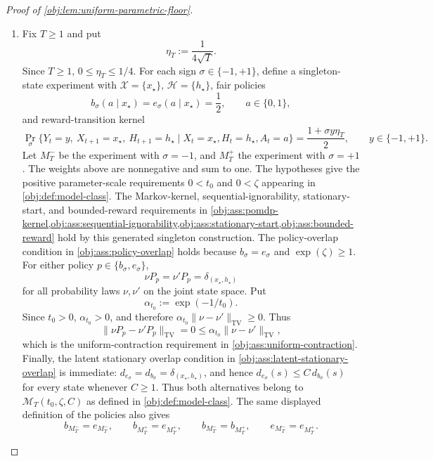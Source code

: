 \begin{proof}[Proof of \cref{obj:lem:uniform-parametric-floor}]
\begin{enumerate}
\item Fix \(T\ge 1\) and put
\[
\eta_T:=\frac{1}{4\sqrt T}.
\]
Since \(T\ge1\), \(0\le \eta_T\le 1/4\).  For each sign
\(\sigma\in\{-1,+1\}\), define a singleton-state experiment with
\(\mathcal X=\{x_\star\}\), \(\mathcal H=\{h_\star\}\), fair policies
\[
b_\sigma(a\mid x_\star)=e_\sigma(a\mid x_\star)=\frac12,
\qquad a\in\{0,1\},
\]
and reward-transition kernel
\[
\Pr_\sigma\{Y_t=y,\ X_{t+1}=x_\star,\ H_{t+1}=h_\star
       \mid X_t=x_\star,H_t=h_\star,A_t=a\}
=
\frac{1+\sigma y\eta_T}{2},
\qquad y\in\{-1,+1\}.
\]
Let \(M_T^{-}\) be the experiment with \(\sigma=-1\), and \(M_T^{+}\) the
experiment with \(\sigma=+1\).  The weights above are nonnegative and sum to
one.  The hypotheses give the positive parameter-scale requirements
\(0<t_0\) and \(0<\zeta\) appearing in \cref{obj:def:model-class}.  The
Markov-kernel, sequential-ignorability, stationary-start, and bounded-reward
requirements in
\cref{obj:ass:pomdp-kernel,obj:ass:sequential-ignorability,obj:ass:stationary-start,obj:ass:bounded-reward}
hold by this generated singleton construction.  The policy-overlap condition
in \cref{obj:ass:policy-overlap} holds because \(b_\sigma=e_\sigma\) and
\(\exp(\zeta)\ge1\).  For either policy \(p\in\{b_\sigma,e_\sigma\}\),
\[
\nu P_p=\nu'P_p=\delta_{(x_\star,h_\star)}
\]
for all probability laws \(\nu,\nu'\) on the joint state space.  Put
\[
\alpha_{t_0}:=\exp(-1/t_0).
\]
Since \(t_0>0\), \(\alpha_{t_0}>0\), and therefore
\(\alpha_{t_0}\|\nu-\nu'\|_{\mathrm{TV}}\ge0\).  Thus
\[
\|\nu P_p-\nu'P_p\|_{\mathrm{TV}}
=0
\le
\alpha_{t_0}\|\nu-\nu'\|_{\mathrm{TV}},
\]
which is the uniform-contraction requirement in
\cref{obj:ass:uniform-contraction}.  Finally, the latent stationary overlap condition in
\cref{obj:ass:latent-stationary-overlap} is immediate:
\(d_{e_\sigma}=d_{b_\sigma}=\delta_{(x_\star,h_\star)}\), and hence
\(d_{e_\sigma}(s)\le C\,d_{b_\sigma}(s)\) for every state whenever \(C\ge1\).
Thus both alternatives belong to \(\mathcal M_T(t_0,\zeta,C)\) as defined in
\cref{obj:def:model-class}.  The same displayed definition of the policies
also gives
\[
b_{M_T^-}=e_{M_T^-},\qquad
b_{M_T^+}=e_{M_T^+},\qquad
b_{M_T^-}=b_{M_T^+},\qquad
e_{M_T^-}=e_{M_T^+}.
\]


\end{enumerate}
\end{proof}
